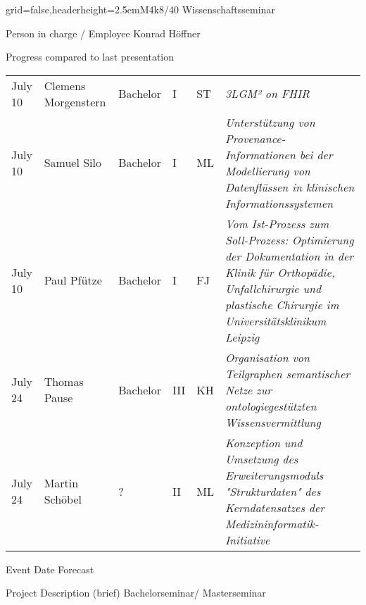 \documentclass[english]{kiesgrube}
\begin{document}
\begin{poster}{grid=false,headerheight=2.5em}{}{M4k8/40 Wissenschaftsseminar}{}{}
\begin{posterbox}[name=person,column=0,row=0]{Person in charge / Employee}
Konrad Höffner
\end{posterbox}
\begin{posterbox}[name=progress,below=person,span=2]{Progress compared to last presentation}
\small
\begin{tabulary}{\textwidth}{lllllL}
July 10	&Clemens Morgenstern		&Bachelor	&I		&ST	&\emph{3LGM² on FHIR}\\
July 10	&Samuel Silo			&Bachelor	&I		&ML	&\emph{Unterstützung von Provenance-Informationen bei der Modellierung von Datenflüssen in klinischen Informationssystemen}\\
July 10	&Paul Pfütze			&Bachelor	&I		&FJ	&\emph{Vom Ist-Prozess zum Soll-Prozess: Optimierung der Dokumentation in der Klinik für Orthopädie, Unfallchirurgie und plastische Chirurgie im Universitätsklinikum Leipzig}\\
July 24 &Thomas Pause			&Bachelor	&III		&KH	&\emph{Organisation von Teilgraphen semantischer Netze zur ontologiegestützten Wissensvermittlung}\\
July 24 &Martin Schöbel			&?		&II		&ML	&\emph{Konzeption und Umsetzung des Erweiterungsmoduls "Strukturdaten" des Kerndatensatzes der Medizininformatik-Initiative}\\
\end{tabulary}
\end{posterbox}
\begin{posterbox}[name=event,below=progress,span=2]{Event Date Forecast}
\end{posterbox}
\begin{posterbox}[name=description,column=1,row=0]{Project Description (brief)}
Bachelorseminar/ Masterseminar
\end{posterbox}

\end{poster}
\end{document}
